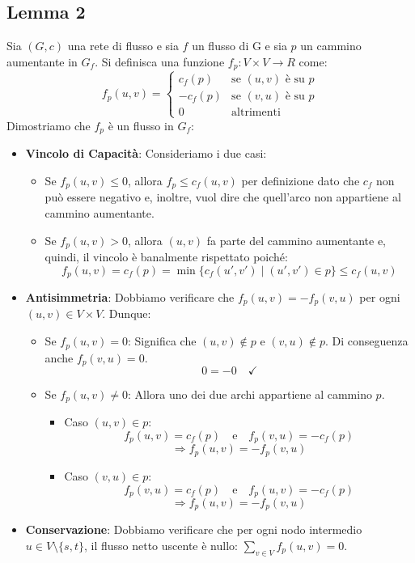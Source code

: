 \subsection*{Lemma 2}
Sia $(G,c)$ una rete di flusso e sia $f$ un flusso di G e sia $p$ un cammino aumentante in $G_f$. Si definisca una funzione $f_p: V \times V \to R$ come:
\[
f_p(u, v) = 
\begin{cases} 
   c_f(p) & \text{se } (u, v) \text{ è su } p \\
   -c_f(p) & \text{se } (v, u) \text{ è su } p \\
   0 & \text{altrimenti}
\end{cases}
\]
Dimostriamo che $f_p$ è un flusso in $G_f$:
\begin{itemize}
    \item \textbf{Vincolo di Capacità}: Consideriamo i due casi:
    \begin{itemize}
        \item Se $f_p(u,v)\leq 0$, allora $f_p \leq c_f(u,v)$ per definizione dato che $c_f$ non può essere negativo e, inoltre, vuol dire che quell'arco non appartiene al cammino aumentante.
        \item Se $f_p(u,v) > 0$, allora $(u,v)$ fa parte del cammino aumentante e, quindi, il vincolo è banalmente rispettato poiché: 
        \[f_p(u,v) = c_f(p) = \min \{ c_f(u',v') \mid (u',v') \in p \} \le c_f(u,v)\]
    \end{itemize}
    \item \textbf{Antisimmetria}: Dobbiamo verificare che $f_p(u,v) = -f_p(v,u)$ per ogni $(u,v) \in V \times V$. Dunque:
    \begin{itemize}
        \item Se $f_p(u,v) = 0$:
        Significa che $(u,v) \notin p$ e $(v,u) \notin p$. Di conseguenza anche $f_p(v,u) = 0$.
        \[ 0 = -0 \quad \checkmark \]

        \item Se $f_p(u,v) \ne 0$:
        Allora uno dei due archi appartiene al cammino $p$.
        \begin{itemize}
            \item Caso $(u,v) \in p$:
            \[ f_p(u,v) = c_f(p) \quad \text{e} \quad f_p(v,u) = -c_f(p) \]
            \[ \Rightarrow f_p(u,v) = -f_p(v,u) \]
            
            \item Caso $(v,u) \in p$:
            \[ f_p(v,u) = c_f(p) \quad \text{e} \quad f_p(u,v) = -c_f(p) \]
            \[ \Rightarrow f_p(u,v) = -f_p(v,u) \]
        \end{itemize}
    \end{itemize}
    \item \textbf{Conservazione}: Dobbiamo verificare che per ogni nodo intermedio $u \in V \setminus \{s,t\}$, il flusso netto uscente è nullo: $\sum_{v \in V} f_p(u,v) = 0$.


\end{itemize}
